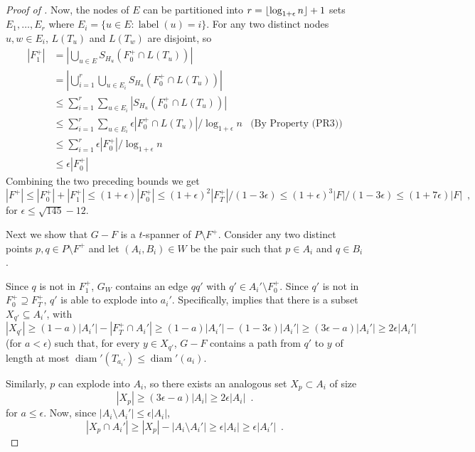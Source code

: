 \documentclass{patmorin}
\DeclareMathOperator{\diam}{diam}
\DeclareMathOperator{\lbl}{label}
\begin{document}
\begin{proof}[Proof of ]
  Now, the nodes of $E$ can be partitioned into
  $r={\lfloor \log_{1+\epsilon} n \rfloor}+1$ sets $E_1,\ldots,E_r$ where $E_i =
  \{u \in E :\lbl(u)=i\}$.  For any two distinct nodes $u,w\in E_i$,
  $L(T_u)$ and $L(T_w)$ are disjoint, so
  \begin{align*}
     |F^+_1| 
     & = \left|\bigcup_{u\in E} S_{H_u}(F^+_0\cap L(T_u))\right| \\
     & = \left|\bigcup_{i=1}^r\bigcup_{u\in E_i} S_{H_u}(F^+_0\cap L(T_u))\right| \\
     & \le \sum_{i=1}^r\sum_{u\in E_i} |S_{H_u}(F^+_0\cap L(T_u))| \\
     & \le \sum_{i=1}^r\sum_{u\in E_i} \epsilon|F^+_0\cap L(T_u)|/\log_{1+\epsilon} n & \text{(By Property~(PR3))} \\
     & \le \sum_{i=1}^r \epsilon|F^+_0|/\log_{1+\epsilon} n \\
     & \le \epsilon|F^+_0|
  \end{align*}
  Combining the two preceding bounds  we get
  \[
      |F^+|\le |F^+_0|+|F^+_1|
      \le (1+\epsilon)|F^+_0|
      \le (1+\epsilon)^2|F^+_T|/(1-3\epsilon)
      \le (1+\epsilon)^3|F|/(1-3\epsilon)
      \le (1+7\epsilon)|F| \enspace ,
  \]
  for $\epsilon \le \sqrt{145}-12$.

  Next we show that $G-F$ is a $t$-spanner of $P\setminus F^+$.
  Consider any two distinct points $p,q\in P\setminus F^+$ and
  let $(A_i,B_i)\in W$ be the pair such that $p\in A_i$ and $q\in B_i$.


  Since $q$ is not in $F^+_1$, $G_W$ contains an edge $qq'$ with $q'\in
  A_i'\setminus F^+_0$.
  Since $q'$ is not in $F^+_0\supseteq F^+_T$, $q'$ is able to explode
  into $a_i'$.  Specifically,  implies that there is
  a subset $X_{q'}\subseteq A_i'$, with
  \[  |X_{q'}|\ge (1-a)|A_i'| - |F^+_T\cap A_i'| 
        \ge (1-a)|A_i'| - (1-3\epsilon)|A_i'| 
        \ge (3\epsilon-a)|A_i'| \ge 2\epsilon|A_i'|
  \] 
  (for $a < \epsilon$)
  such that, for every $y\in X_{q'}$, $G-F$ contains a path from $q'$ to $y$
  of length at most $\diam'(T_{a_i'})\le \diam'(a_i)$.

  Similarly, $p$ can explode into $A_i$, so there exists an analogous
  set $X_p\subset A_i$ of size \[  |X_p| \ge (3\epsilon-a)|A_i|
  \ge 2\epsilon|A_i| \enspace .  \] for $a\le\epsilon$.  Now,
  since $|A_i\setminus A_i'|\le \epsilon |A_i|$, 
  \[ |X_p\cap A_i'|\ge |X_p|-|A_i\setminus A_i'|\ge \epsilon|A_i| \ge \epsilon|A_i'| \enspace . \]


\end{proof}
\end{document}

